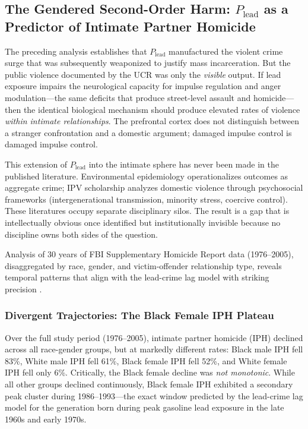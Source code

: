 \documentclass[12pt,openany]{book}
\begin{document}
\subsection{The Gendered Second-Order Harm: \texorpdfstring{$P_{\text{lead}}$}{P\_lead} as a Predictor of Intimate Partner Homicide}

The preceding analysis establishes that $P_{\text{lead}}$ manufactured the violent crime surge that was subsequently weaponized to justify mass incarceration. But the public violence documented by the UCR was only the \textit{visible} output. If lead exposure impairs the neurological capacity for impulse regulation and anger modulation---the same deficits that produce street-level assault and homicide---then the identical biological mechanism should produce elevated rates of violence \textit{within intimate relationships}. The prefrontal cortex does not distinguish between a stranger confrontation and a domestic argument; damaged impulse control is damaged impulse control.

This extension of $P_{\text{lead}}$ into the intimate sphere has never been made in the published literature. Environmental epidemiology operationalizes outcomes as aggregate crime; IPV scholarship analyzes domestic violence through psychosocial frameworks (intergenerational transmission, minority stress, coercive control). These literatures occupy separate disciplinary silos. The result is a gap that is intellectually obvious once identified but institutionally invisible because no discipline owns both sides of the question.

Analysis of 30 years of FBI Supplementary Homicide Report data (1976--2005), disaggregated by race, gender, and victim-offender relationship type, reveals temporal patterns that align with the lead-crime lag model with striking precision \cite{fox_zawitz2007, paulozzi_iph, puzone_iph}.

\subsubsection{Divergent Trajectories: The Black Female IPH Plateau}

Over the full study period (1976--2005), intimate partner homicide (IPH) declined across all race-gender groups, but at markedly different rates: Black male IPH fell 83\%, White male IPH fell 61\%, Black female IPH fell 52\%, and White female IPH fell only 6\%. Critically, the Black female decline was \textit{not monotonic}. While all other groups declined continuously, Black female IPH exhibited a secondary peak cluster during 1986--1993---the exact window predicted by the lead-crime lag model for the generation born during peak gasoline lead exposure in the late 1960s and early 1970s.
\end{document}
